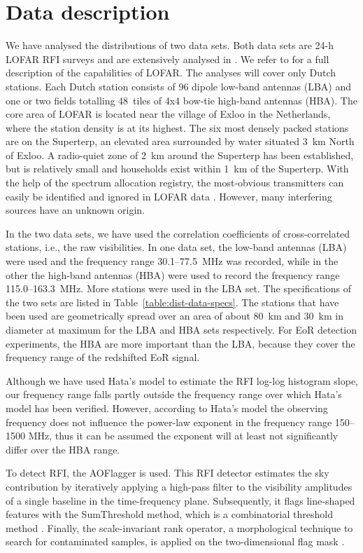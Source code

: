 \documentclass[useAMS,usenatbib]{mn2e}
\begin{document}
\section{Data description} \label{sec:dist-data}
We have analysed the distributions of two data sets. Both data sets are 24-h LOFAR RFI surveys and are extensively analysed in \citet{lofar-radio-environment}. We refer to \citet{lofar-overview-2013} for a full description of the capabilities of LOFAR. The analyses will cover only Dutch stations. Each Dutch station consists of 96 dipole low-band antennas (LBA) and one or two fields totalling 48~tiles of 4x4 bow-tie high-band antennas (HBA). The core area of LOFAR is located near the village of Exloo in the Netherlands, where the station density is at its highest. The six most densely packed stations are on the Superterp, an elevated area surrounded by water situated 3~km North of Exloo. A radio-quiet zone of 2~km around the Superterp has been established, but is relatively small and households exist within 1~km of the Superterp. With the help of the spectrum allocation registry, the most-obvious transmitters can easily be identified and ignored in LOFAR data \citep{lofar-radio-environment}. However, many interfering sources have an unknown origin.

In the two data sets, we have used the correlation coefficients of cross-correlated stations, i.e., the raw visibilities. In one data set, the low-band antennas (LBA) were used and the frequency range 30.1--77.5~MHz was recorded, while in the other the high-band antennas (HBA) were used to record the frequency range 115.0--163.3~MHz. More stations were used in the LBA set. The specifications of the two sets are listed in Table~\ref{table:dist-data-specs}. The stations that have been used are geometrically spread over an area of about 80~km and 30~km in diameter at maximum for the LBA and HBA sets respectively. For EoR detection experiments, the HBA are more important than the LBA, because they cover the frequency range of the redshifted EoR signal.

Although we have used Hata's model to estimate the RFI log-log histogram slope, our frequency range falls partly outside the frequency range over which Hata's model has been verified. However, according to Hata's model the observing frequency does not influence the power-law exponent in the frequency range 150--1500 MHz, thus it can be assumed the exponent will at least not significantly differ over the HBA range.

To detect RFI, the AOFlagger \citep{LOFAR-RFI-pipeline} is used. This RFI detector estimates the sky contribution by iteratively applying a high-pass filter to the visibility amplitudes of a single baseline in the time-frequency plane. Subsequently, it flags line-shaped features with the SumThreshold method, which is a combinatorial threshold method \citep{post-correlation-rfi-classification}. Finally, the scale-invariant rank operator, a morphological technique to search for contaminated samples, is applied on the two-dimensional flag mask \citep{scale-invariant-rank-operator}.
\end{document}
